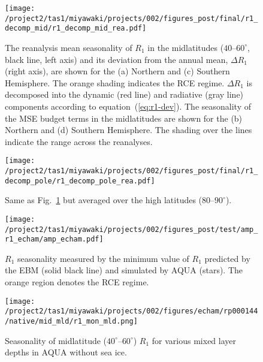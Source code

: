 \documentclass{ametsocV5}
\begin{document}
\begin{figure}[t]
  \noindent\texttt{[image: /project2/tas1/miyawaki/projects/002/figures\_post/final/r1\_decomp\_mid/r1\_decomp\_mid\_rea.pdf]}\\
  \caption{The reanalysis mean seasonality of $R_{1}$ in the midlatitudes ($40$--$60^{\circ}$, black line, left axis) and its deviation from the annual mean, $\Delta R_1$ (right axis), are shown for the (a) Northern and (c) Southern Hemisphere. The orange shading indicates the RCE regime. $\Delta R_1$ is decomposed into the dynamic (red line) and radiative (gray line) components according to equation~(\ref{eq:r1-dev}). The seasonality of the MSE budget terms in the midlatitudes are shown for the (b) Northern and (d) Southern Hemisphere. The shading over the lines indicate the range across the reanalyses.}
  \label{fig:rea-r1-decomp-mid}
\end{figure}

\begin{figure}[t]
  \noindent\texttt{[image: /project2/tas1/miyawaki/projects/002/figures\_post/final/r1\_decomp\_pole/r1\_decomp\_pole\_rea.pdf]}\\
  \caption{Same as Fig.~\ref{fig:rea-r1-decomp-mid} but averaged over the high latitudes ($80$--$90^{\circ}$).}
  \label{fig:rea-r1-decomp-pole}
\end{figure}

\begin{figure}
  \noindent\texttt{[image: /project2/tas1/miyawaki/projects/002/figures\_post/test/amp\_r1\_echam/amp\_echam.pdf]}\\
  \caption{$R_1$ seasonality measured by the minimum value of $R_1$ predicted by the EBM (solid black line) and simulated by AQUA (stars). The orange region denotes the RCE regime.}
  \label{fig:amp-r1-echam}
\end{figure}

\begin{figure}[t]
    \noindent\texttt{[image: /project2/tas1/miyawaki/projects/002/figures/echam/rp000144/native/mid\_mld/r1\_mon\_mld.png]}\\
    \caption{Seasonality of midlatitude ($40^\circ$--$60^\circ$) $R_1$ for various mixed layer depths in AQUA without sea ice.}
\label{fig:echam-rce-mld}
\end{figure}
\end{document}
